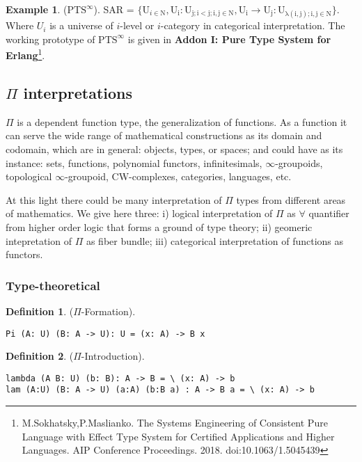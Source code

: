 \documentclass{article}
\theoremstyle{definition}
\newtheorem{definition}{Definition}
\newtheorem{example}{Example}
\begin{document}
\begin{example} ($\mathrm{PTS}^\infty$). SAR = $\{ \mathrm{U}_{i \in \mathrm{N}},
    \mathrm{U_i : U_{j; i < j; i,j \in N}},
    \mathrm{U_i} \rightarrow \mathrm{U_j} : \mathrm{U_{\lambda(i,j); i,j \in \mathrm{N}}}
    \}$. Where $U_i$ is a universe of $i$-level or $i$-category in categorical interpretation.
    The working prototype of $\mathrm{PTS}^\infty$ is given in
    {\bf Addon I: Pure Type System for Erlang}\footnote{M.Sokhatsky,P.Maslianko. The Systems Engineering of Consistent Pure Language with Effect Type System for Certified Applications and Higher Languages. AIP Conference Proceedings. 2018.
    doi:10.1063/1.5045439}.
\end{example}

\subsection{$\Pi$ interpretations}

$\Pi$ is a dependent function type, the generalization of functions.
As a function it can serve the wide range of mathematical constructions as its domain and codomain,
which are in general: objects, types, or spaces; and could have as its
instance: sets, functions, polynomial functors, infinitesimals, $\infty$-groupoids,
topological $\infty$-groupoid, CW-complexes,
categories, languages, etc.

At this light there could be many interpretation of $\Pi$ types from different
areas of mathematics. We give here three: i) logical interpretation of $\Pi$ as
$\forall$ quantifier from higher order logic
that forms a ground of type theory; ii) geomeric intepretation of $\Pi$ as fiber bundle;
iii) categorical interpretation of functions as functors.

\subsubsection{Type-theoretical}

\begin{definition} ($\Pi$-Formation).
\begin{lstlisting}
Pi (A: U) (B: A -> U): U = (x: A) -> B x
\end{lstlisting}
\end{definition}

\begin{definition} ($\Pi$-Introduction).
\begin{lstlisting}
lambda (A B: U) (b: B): A -> B = \ (x: A) -> b
lam (A:U) (B: A -> U) (a:A) (b:B a) : A -> B a = \ (x: A) -> b
\end{lstlisting}
\end{definition}
\end{document}
